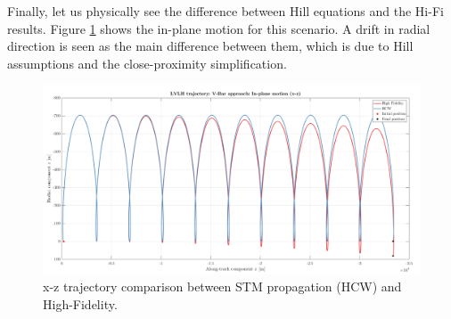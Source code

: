 		\indent Finally, let us physically see the difference between Hill equations and the Hi-Fi results. Figure \ref{figCh2:LVLH_V_bar} shows the in-plane motion for this scenario. A drift in radial direction is seen as the main difference between them, which is due to Hill assumptions and the close-proximity simplification.
		\begin{figure}[!htb]
		\begin{changemargin}{-2.2cm}{-1cm}
		\begin{adjustbox}{width=1.2\textwidth}
		\centering\includegraphics[width = \linewidth]{Chapters/Chapter_02/LVLH_trajectory__V_Bar_approach_IP}
		\end{adjustbox}
		\end{changemargin}
		\caption{x-z trajectory comparison between STM propagation (HCW) and High-Fidelity.}
		\label{figCh2:LVLH_V_bar}
		\end{figure}
